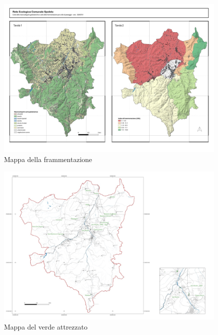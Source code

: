 \documentclass[
]{book}
\begin{document}
\begin{figure}

{\centering \includegraphics[width=\linewidth]{./figs/agendaUrbana/cartaFrammentazione} 

}

\caption{Mappa della frammentazione}\label{fig:agUframm}
\end{figure}

\begin{figure}

{\centering \includegraphics[width=\linewidth]{./figs/agendaUrbana/mappaVerdiAttrezzati20240619} 

}

\caption{Mappa del verde attrezzato}\label{fig:agUverdi}
\end{figure}
\end{document}

